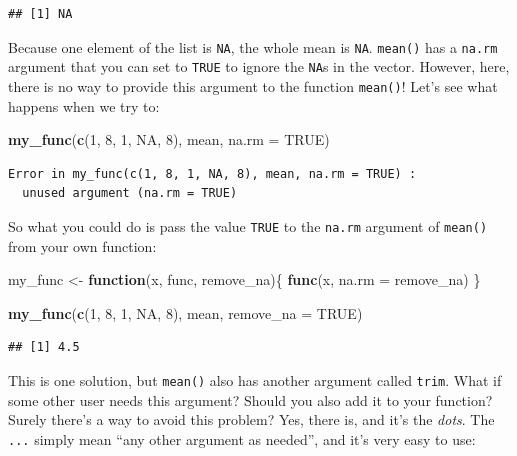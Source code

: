 \documentclass[]{gitbook}
\newenvironment{Shaded}{\begin{snugshade}}{\end{snugshade}}
\newcommand{\ControlFlowTok}[1]{\textcolor[rgb]{0.13,0.29,0.53}{\textbf{#1}}}
\newcommand{\DataTypeTok}[1]{\textcolor[rgb]{0.13,0.29,0.53}{#1}}
\newcommand{\DecValTok}[1]{\textcolor[rgb]{0.00,0.00,0.81}{#1}}
\newcommand{\KeywordTok}[1]{\textcolor[rgb]{0.13,0.29,0.53}{\textbf{#1}}}
\newcommand{\NormalTok}[1]{#1}
\newcommand{\OtherTok}[1]{\textcolor[rgb]{0.56,0.35,0.01}{#1}}
\newcommand{\StringTok}[1]{\textcolor[rgb]{0.31,0.60,0.02}{#1}}
\theoremstyle{definition}
\theoremstyle{definition}
\theoremstyle{definition}
\theoremstyle{remark}
\begin{document}
\begin{verbatim}
## [1] NA
\end{verbatim}

Because one element of the list is \texttt{NA}, the whole mean is
\texttt{NA}. \texttt{mean()} has a \texttt{na.rm} argument that you can
set to \texttt{TRUE} to ignore the \texttt{NA}s in the vector. However,
here, there is no way to provide this argument to the function
\texttt{mean()}! Let's see what happens when we try to:

\begin{Shaded}
\begin{Highlighting}[]
\KeywordTok{my_func}\NormalTok{(}\KeywordTok{c}\NormalTok{(}\DecValTok{1}\NormalTok{, }\DecValTok{8}\NormalTok{, }\DecValTok{1}\NormalTok{, }\OtherTok{NA}\NormalTok{, }\DecValTok{8}\NormalTok{), mean, }\DataTypeTok{na.rm =} \OtherTok{TRUE}\NormalTok{)}
\end{Highlighting}
\end{Shaded}

\begin{verbatim}
Error in my_func(c(1, 8, 1, NA, 8), mean, na.rm = TRUE) :
  unused argument (na.rm = TRUE)
\end{verbatim}

So what you could do is pass the value \texttt{TRUE} to the
\texttt{na.rm} argument of \texttt{mean()} from your own function:

\begin{Shaded}
\begin{Highlighting}[]
\NormalTok{my_func <-}\StringTok{ }\ControlFlowTok{function}\NormalTok{(x, func, remove_na)\{}
  \KeywordTok{func}\NormalTok{(x, }\DataTypeTok{na.rm =}\NormalTok{ remove_na)}
\NormalTok{\}}

\KeywordTok{my_func}\NormalTok{(}\KeywordTok{c}\NormalTok{(}\DecValTok{1}\NormalTok{, }\DecValTok{8}\NormalTok{, }\DecValTok{1}\NormalTok{, }\OtherTok{NA}\NormalTok{, }\DecValTok{8}\NormalTok{), mean, }\DataTypeTok{remove_na =} \OtherTok{TRUE}\NormalTok{)}
\end{Highlighting}
\end{Shaded}

\begin{verbatim}
## [1] 4.5
\end{verbatim}

This is one solution, but \texttt{mean()} also has another argument
called \texttt{trim}. What if some other user needs this argument?
Should you also add it to your function? Surely there's a way to avoid
this problem? Yes, there is, and it's the \emph{dots}. The \texttt{...}
simply mean ``any other argument as needed'', and it's very easy to use:
\end{document}
